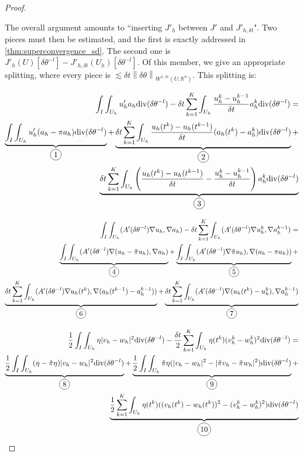 \documentclass[english,a4paper,9pt,oneside]{scrbook}	%
\theoremstyle{break}
\newenvironment{mproof}[1][\proofname]{%
  \begin{proof}[#1]$ $\par\nobreak\ignorespaces
}{%
  \end{proof}
}
\renewcommand*{\proofname}{Proof}
\theoremstyle{remark}
\newcommand{\mR}{\mathbb{R}}
\newcommand{\ds}{\displaystyle}
\newcommand{\norm}[1]{\left\lVert#1\right\rVert}
\newcommand{\te}{\theta}
\newcommand{\dive}{\text{div}}
\newcommand*\circled[1]{\tikz[baseline=(char.base)]{
            \node[shape=circle,draw,inner sep=2pt] (char) {#1};}}
\begin{document}
\begin{mproof}
The overall argument amounts to ``inserting $J'_h$ between $J'$ and $J'_{h,\delta t}$". Two pieces must then be estimated, and the first is exactly addressed in \cref{thm:superconvergence_sd}.
The second one is $\ds J'_h(U)[\delta \te^{-l}] - J'_{h,\delta t}(U_h)[\delta \te^{-l}]$. Of this member, we give an appropriate splitting, where every piece is $\lesssim \delta t\norm{\delta \te}_{W^{1,\infty}(U;\mR^n)}$. This splitting is:

\begin{align*}
	\int_I\int_{U_h}u_h'a_h\dive(\delta \te^{-l})-\delta t \sum_{k=1}^K \int_{U_h} \frac{u_h^k-u_h^{k-1}}{\delta t}a_h^k \dive(\delta \te^{-l})  =\\
	\underbrace{\int_I\int_{U_h}u_h'(a_h-\pi a_h)\dive(\delta \te^{-l})}_{\circled{1}}+
	\underbrace{\delta t \sum_{k=1}^K\int_{U_h}\frac{u_h(t^k)-u_h(t^{k-1})}{\delta t}(a_h(t^k)-a_h^k)\dive(\delta \te^{-l})}_{\circled{2}}+\\
	\underbrace{\delta t \sum_{k=1}^K \int_{U_h} \left (\frac{u_h(t^k)-u_h(t^{k-1})}{\delta t}-\frac{u_h^k-u_h^{k-1}}{\delta t}\right )a_h^k \dive(\delta \te^{-l})}_{\circled{3}}
\end{align*}


\begin{align*}
	\int_I \int_{U_h} (A'(\delta \te^{-l})\nabla u_h,\nabla a_h) - \delta t \sum_{k=1}^K \int_{U_h} (A'(\delta \te^{-l})\nabla u_h^k,\nabla a_h^{k-1}) =  \\
	\underbrace{\int_I \int_{U_h} (A'(\delta \te^{-l})\nabla (u_h-\tilde{\pi} u_h),\nabla a_h) }_{\circled{4}}+ 
	\underbrace{\int_I \int_{U_h} (A'(\delta \te^{-l})\nabla \tilde{\pi} u_h ) ,\nabla (a_h - \pi a_h))}_{\circled{5}} +\\
	\underbrace{\delta t \sum_{k=1}^K \int_{U_h} (A'(\delta \te^{-l})\nabla u_h(t^k) , \nabla( a_h(t^{k-1})-a_h^{k-1}))}_{\circled{6}} +
	\underbrace{\delta t \sum_{k=1}^K \int_{U_h} (A'(\delta \te^{-l})\nabla (u_h(t^k)-u_h^k ) ,\nabla a_h^{k-1})}_{\circled{7}}
\end{align*}

\begin{align*}
	\frac{1}{2} \int_I \int_{U_h} \eta |v_h-w_h|^2\dive(\delta \te^{-l}) - \frac{\delta t}{2} \sum_{k=1}^K \int_{U_h}\eta(t^k)(v_h^k-w_h^k)^2\dive(\delta \te^{-l}) = \\
	\underbrace{\frac{1}{2} \int_I \int_{U_h} (\eta-\tilde{\pi}\eta) |v_h-w_h|^2\dive(\delta \te^{-l})}_{\circled{8}}+
	\underbrace{\frac{1}{2} \int_I \int_{U_h} \tilde{\pi} \eta (|v_h-w_h|^2 - |\tilde{\pi} v_h-\tilde{\pi}w_h|^2)\dive(\delta \te^{-l})}_{\circled{9}}+\\
	\underbrace{\frac{1}{2} \sum_{k=1}^K \int_{U_h}\eta(t^k)((v_h(t^k)-w_h(t^k))^2-(v_h^k-w_h^k)^2)\dive(\delta \te^{-l})}_{\circled{10}}
\end{align*}


\end{mproof}
\end{document}
